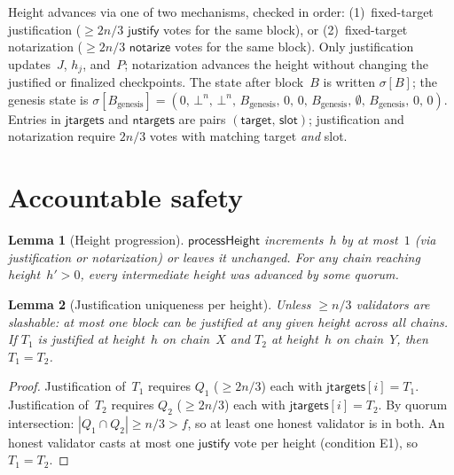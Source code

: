 \ifx\litemode\undefined\documentclass{article}\fi
\newcommand{\target}{\mathsf{target}}
\newcommand{\justify}{\mathsf{justify}}
\newcommand{\notarize}{\mathsf{notarize}}
\theoremstyle{plain}
\newtheorem{lemma}{Lemma}
\theoremstyle{definition}
\theoremstyle{remark}
\begin{document}
\begin{figure}[H]
\begin{center}
\begin{boxedminipage}{\textwidth}
\begin{algorithmic}[1]
\end{algorithmic}
\end{boxedminipage}
\end{center}
\end{figure}

Height advances via one of two mechanisms, checked in order: (1)~fixed-target justification ($\geq 2n/3$ $\justify$ votes for the same block), or (2)~fixed-target notarization ($\geq 2n/3$ $\notarize$ votes for the same block).
Only justification updates~$J$, $h_j$, and~$P$; notarization advances the height without changing the justified or finalized checkpoints.
The state after block~$B$ is written $\sigma[B]$; the genesis state is $\sigma[B_{\mathrm{genesis}}] = (0,\, \bot^n,\, \bot^n,\, B_{\mathrm{genesis}},\, 0,\, 0,\, B_{\mathrm{genesis}},\, \emptyset,\, B_{\mathrm{genesis}},\, 0,\, 0)$.
Entries in $\mathsf{jtargets}$ and $\mathsf{ntargets}$ are pairs $(\target,\, \mathsf{slot})$; justification and notarization require $2n/3$ votes with matching target \emph{and} slot.

\section{Accountable safety}

\begin{lemma}[Height progression]\label{lem:heightprog}
$\textsf{processHeight}$ increments~$h$ by at most~$1$ (via justification or notarization) or leaves it unchanged.
For any chain reaching height~$h' > 0$, every intermediate height was advanced by some quorum.
\end{lemma}

\begin{lemma}[Justification uniqueness per height]\label{lem:uniqueness}
Unless $\geq n/3$ validators are slashable: at most one block can be justified at any given height across all chains.
If $T_1$ is justified at height~$h$ on chain~$X$ and $T_2$ at height~$h$ on chain~$Y$, then $T_1 = T_2$.
\end{lemma}

\begin{proof}
Justification of~$T_1$ requires $Q_1$ ($\geq 2n/3$) each with $\mathsf{jtargets}[i] = T_1$.
Justification of~$T_2$ requires $Q_2$ ($\geq 2n/3$) each with $\mathsf{jtargets}[i] = T_2$.
By quorum intersection: $|Q_1 \cap Q_2| \geq n/3 > f$, so at least one honest validator is in both.
An honest validator casts at most one $\justify$ vote per height (condition E1), so $T_1 = T_2$.
\end{proof}
\end{document}
